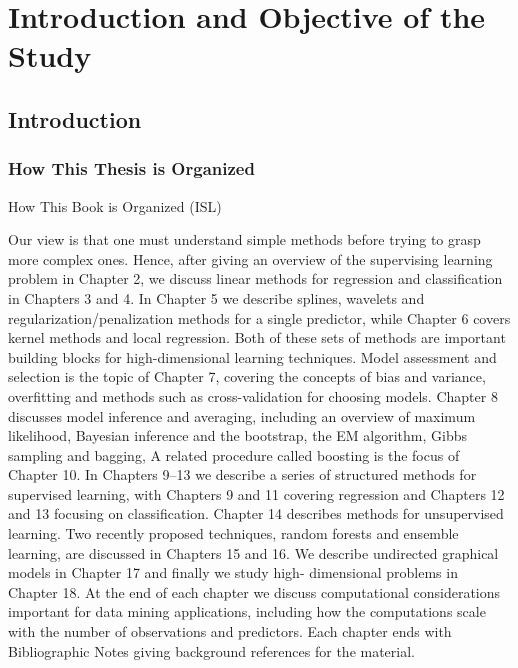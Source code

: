 \chapter{Introduction and Objective of the Study}

\thispagestyle{plain}
\section{Introduction}\label{sec:Introduction}

\subsection{How This Thesis is Organized}

How This Book is Organized (ISL)

Our view is that one must understand simple methods before trying to grasp more complex ones. Hence, after giving an overview of the supervising learning problem in Chapter 2, we discuss linear methods for regression and classification in Chapters 3 and 4. In Chapter 5 we describe splines, wavelets and regularization/penalization methods for a single predictor, while Chapter 6 covers kernel methods and local regression. Both of these sets of methods are important building blocks for high-dimensional learning techniques. Model assessment and selection is the topic of Chapter 7, covering the concepts of bias and variance, overfitting and methods such as cross-validation for choosing models. Chapter 8 discusses model inference and averaging, including an overview of maximum likelihood, Bayesian inference and the bootstrap, the EM algorithm, Gibbs sampling and bagging, A related procedure called boosting is the focus of Chapter 10.
In Chapters 9–13 we describe a series of structured methods for supervised learning, with Chapters 9 and 11 covering regression and Chapters 12 and 13 focusing on classification. Chapter 14 describes methods for unsupervised learning. Two recently proposed techniques, random forests and ensemble learning, are discussed in Chapters 15 and 16. We describe undirected graphical models in Chapter 17 and finally we study high- dimensional problems in Chapter 18.
At the end of each chapter we discuss computational considerations important for data mining applications, including how the computations scale with the number of observations and predictors. Each chapter ends with Bibliographic Notes giving background references for the material.